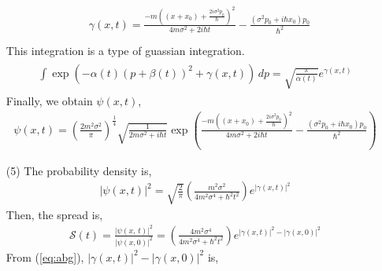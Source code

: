 \documentclass[floatfix,nofootinbib,superscriptaddress,fleqn]{revtex4}
\begin{document}
\begin{itemize}
\begin{align}
\begin{split}
    &\gamma(x,t)=\frac{-m\left((x+x_0)+\frac{2i\sigma^2p_0}{\hbar}\right)^2}
    {4m\sigma^2+2i\hbar t}-\frac{(\sigma^2p_0+i\hbar x_0)p_0}{\hbar^2} \\
    \end{split}
  \end{align}
  This integration is a type of guassian integration.
  \begin{align}
    \begin{split}
      \int\exp{\left( -\alpha(t)\left(p+\beta(t)\right)^2+\gamma(x,t) \right)}\,dp
      =\sqrt{\frac{\pi}{\alpha(t)}}e^{\gamma(x,t)}
    \end{split}
  \end{align}
  Finally, we obtain $\psi(x,t)$,
  \begin{align}
    \psi(x,t) = \left(\frac{2m^2\sigma^2}{\pi}\right)^\frac{1}{4}
    \sqrt{\frac{1}{2m\sigma^2+i\hbar t}}
    \exp{\left(\frac{-m\left((x+x_0)+\frac{2i\sigma^2p_0}{\hbar}\right)^2}
    {4m\sigma^2+2i\hbar t}-\frac{(\sigma^2p_0+i\hbar x_0)p_0}{\hbar^2}\right)}
  \end{align}
  \item[(5)] The probability density is,
  \begin{align}
    |\psi(x,t)|^2 = \sqrt{\frac{2}{\pi}}\left(\frac{m^2\sigma^2}
    {4m^2\sigma^4+\hbar^2t^2}\right)e^{|\gamma(x,t)|^2}
  \end{align}
  Then, the spread is,
  \begin{align}
    \mathcal{S}(t) = \frac{|\psi(x,\,t)|^2}{|\psi(x,0)|^2}
    =\left(\frac{4m^2\sigma^4}
    {4m^2\sigma^4+\hbar^2t^2}\right)
    e^{|\gamma(x,t)|^2-|\gamma(x,0)|^2}
  \end{align}
  From (\ref{eq:abg}), $|\gamma(x,t)|^2-|\gamma(x,0)|^2$ is,
  \begin{align}
    
  \end{align}
  \end{itemize}
\vspace{0.5cm}
\end{document}
